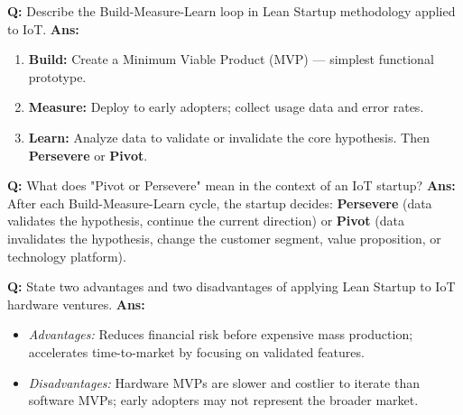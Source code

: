 \documentclass[10pt,a4paper,twocolumn]{article}
\begin{document}
\begin{tcolorbox}[
  colback=white,
  colframe=UnitColorEight,
  colbacktitle=gray!10!white,
  coltitle=black,
  fonttitle=\bfseries\sffamily\small,
  title={Unit VIII $\bullet$ Card 8},
  boxrule=1.2pt,
  arc=2mm,
  outer arc=2mm,
  boxsep=1.5mm,
  top=1mm,
  bottom=1mm,
  left=1.5mm,
  right=1.5mm,
  before skip=2.5mm,
  after skip=2.5mm
]
\textbf{Q:} Describe the Build-Measure-Learn loop in Lean Startup methodology applied to IoT.
\tcbline
\textbf{Ans:} \begin{enumerate}
  \item \textbf{Build:} Create a Minimum Viable Product (MVP) — simplest functional prototype.
  \item \textbf{Measure:} Deploy to early adopters; collect usage data and error rates.
  \item \textbf{Learn:} Analyze data to validate or invalidate the core hypothesis. Then \textbf{Persevere} or \textbf{Pivot}.
\end{enumerate}
\end{tcolorbox}


\begin{tcolorbox}[
  colback=white,
  colframe=UnitColorEight,
  colbacktitle=gray!10!white,
  coltitle=black,
  fonttitle=\bfseries\sffamily\small,
  title={Unit VIII $\bullet$ Card 9},
  boxrule=1.2pt,
  arc=2mm,
  outer arc=2mm,
  boxsep=1.5mm,
  top=1mm,
  bottom=1mm,
  left=1.5mm,
  right=1.5mm,
  before skip=2.5mm,
  after skip=2.5mm
]
\textbf{Q:} What does "Pivot or Persevere" mean in the context of an IoT startup?
\tcbline
\textbf{Ans:} After each Build-Measure-Learn cycle, the startup decides: \textbf{Persevere} (data validates the hypothesis, continue the current direction) or \textbf{Pivot} (data invalidates the hypothesis, change the customer segment, value proposition, or technology platform).
\end{tcolorbox}


\begin{tcolorbox}[
  colback=white,
  colframe=UnitColorEight,
  colbacktitle=gray!10!white,
  coltitle=black,
  fonttitle=\bfseries\sffamily\small,
  title={Unit VIII $\bullet$ Card 10},
  boxrule=1.2pt,
  arc=2mm,
  outer arc=2mm,
  boxsep=1.5mm,
  top=1mm,
  bottom=1mm,
  left=1.5mm,
  right=1.5mm,
  before skip=2.5mm,
  after skip=2.5mm
]
\textbf{Q:} State two advantages and two disadvantages of applying Lean Startup to IoT hardware ventures.
\tcbline
\textbf{Ans:} \begin{itemize}
  \item \textit{Advantages:} Reduces financial risk before expensive mass production; accelerates time-to-market by focusing on validated features.
  \item \textit{Disadvantages:} Hardware MVPs are slower and costlier to iterate than software MVPs; early adopters may not represent the broader market.
\end{itemize}
\end{tcolorbox}
\end{document}
